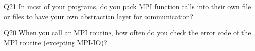 \begin{description}%
\item{Q21} In most of your programs, do you pack MPI function calls into their own file or files to have your own abstraction layer for communication?%
\item{Q20} When you call an MPI routine, how often do you check the error code of the MPI routine  (excepting MPI-IO)?%
\end{description}%
